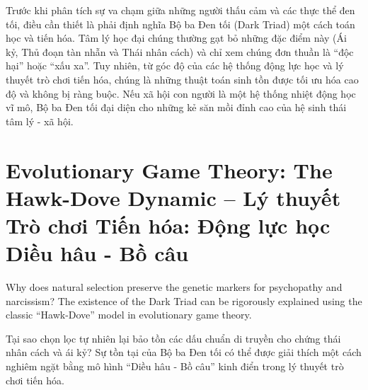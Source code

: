 \documentclass{report}
\begin{document}
Trước khi phân tích sự va chạm giữa những người thấu cảm và các thực thể đen tối, điều cần thiết là phải định nghĩa Bộ ba Đen tối (Dark Triad) một cách toán học và tiến hóa. Tâm lý học đại chúng thường gạt bỏ những đặc điểm này (Ái kỷ, Thủ đoạn tàn nhẫn và Thái nhân cách) và chỉ xem chúng đơn thuần là ``độc hại'' hoặc ``xấu xa''. Tuy nhiên, từ góc độ của các hệ thống động lực học và lý thuyết trò chơi tiến hóa, chúng là những thuật toán sinh tồn được tối ưu hóa cao độ và không bị ràng buộc. Nếu xã hội con người là một hệ thống nhiệt động học vĩ mô, Bộ ba Đen tối đại diện cho những kẻ săn mồi đỉnh cao của hệ sinh thái tâm lý - xã hội.

\section{Evolutionary Game Theory: The Hawk-Dove Dynamic -- Lý thuyết Trò chơi Tiến hóa: Động lực học Diều hâu - Bồ câu}

Why does natural selection preserve the genetic markers for psychopathy and narcissism? The existence of the Dark Triad can be rigorously explained using the classic ``Hawk-Dove'' model in evolutionary game theory.

Tại sao chọn lọc tự nhiên lại bảo tồn các dấu chuẩn di truyền cho chứng thái nhân cách và ái kỷ? Sự tồn tại của Bộ ba Đen tối có thể được giải thích một cách nghiêm ngặt bằng mô hình ``Diều hâu - Bồ câu'' kinh điển trong lý thuyết trò chơi tiến hóa.
\end{document}
